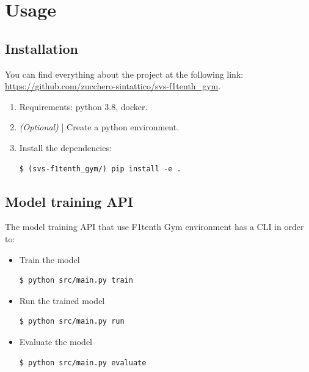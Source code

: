 \documentclass[conference]{IEEEtran}
\begin{document}

%
%
%
\section{Usage}





%
%
%
\subsection{Installation}

You can find everything about the project at the following link: \url{https://github.com/zucchero-sintattico/svs-f1tenth_gym}.

\begin{enumerate}
    \item Requirements: python 3.8, docker.

    \item \emph{(Optional)} | Create a python environment.

    \item Install the dependencies:
\begin{verbatim}
$ (svs-f1tenth_gym/) pip install -e .
\end{verbatim}
\end{enumerate}

%
%
%
\subsection{Model training API}

The model training API that use F1tenth Gym environment has a CLI in order to:

\begin{itemize}
    \item Train the model
\begin{verbatim}
$ python src/main.py train
\end{verbatim}

    \item Run the trained model
\begin{verbatim}
$ python src/main.py run
\end{verbatim}

    \item Evaluate the model
\begin{verbatim}
$ python src/main.py evaluate
\end{verbatim}
\end{itemize}
\end{document}
